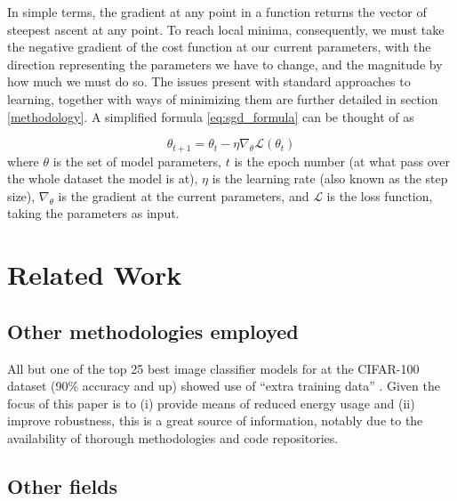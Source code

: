 \documentclass[conference]{IEEEtran}
\begin{document}
In simple terms, the gradient at any point in a function returns the vector of steepest ascent at any point. To reach local minima, consequently, we must take the negative gradient of the cost function at our current parameters, with the direction representing the parameters we have to change, and the magnitude by how much we must do so. The issues present with standard approaches to learning, together with ways of minimizing them are further detailed in section \ref{methodology}. A simplified formula \eqref{eq:sgd_formula} can be thought of as

\begin{equation}
    \theta_{t+1} = \theta_t - \eta \nabla_{\theta} \mathcal{L}(\theta_t)
    \label{eq:sgd_formula}
\end{equation}
where $\theta$ is the set of model parameters, $t$ is the epoch number (at what pass over the whole dataset the model is at), $\eta$ is the learning rate (also known as the step size), $\nabla_\theta$ is the gradient at the current parameters, and $\mathcal{L}$ is the loss function, taking the parameters as input. 

\section{Related Work} \label {related}

\subsection{Other methodologies employed}
All but one of the top 25 best image classifier models for at the CIFAR-100 dataset \cite{cifar100} (90\% accuracy and up) showed use of ``extra training data'' \cite{SOTApwcIC}. Given the focus of this paper is to (i) provide means of reduced energy usage and (ii) improve robustness, this is a great source of information, notably due to the availability of thorough methodologies and code repositories.

\subsection{Other fields}
\end{document}
